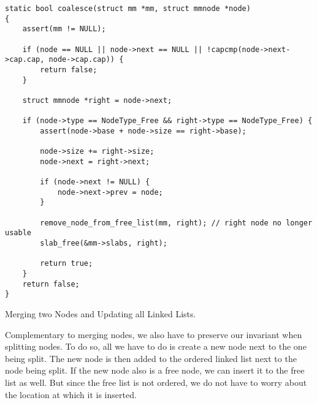 \begin{code}
\begin{mdframed}[style=myframe]
\begin{verbatim}
static bool coalesce(struct mm *mm, struct mmnode *node)
{
    assert(mm != NULL);

    if (node == NULL || node->next == NULL || !capcmp(node->next->cap.cap, node->cap.cap)) {
        return false;
    }

    struct mmnode *right = node->next;

    if (node->type == NodeType_Free && right->type == NodeType_Free) {
        assert(node->base + node->size == right->base);

        node->size += right->size;
        node->next = right->next;

        if (node->next != NULL) {
            node->next->prev = node;
        }

        remove_node_from_free_list(mm, right); // right node no longer usable
        slab_free(&mm->slabs, right);

        return true;
    }
    return false;
}
\end{verbatim}
\end{mdframed}
\caption{Merging two Nodes and Updating all Linked Lists.}
\end{code}
\label{mm:coalesce}

Complementary to merging nodes, we also have to preserve our invariant when splitting nodes. To do so, all we have to do is create a new node next to the one being split. The new node is then added to the ordered linked list next to the node being split. If the new node also is a free node, we can insert it to the free list as well. But since the free list is not ordered, we do not have to worry about the location at which it is inserted.

%
